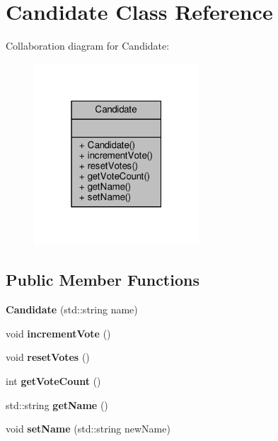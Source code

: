 \hypertarget{classCandidate}{}\section{Candidate Class Reference}
\label{classCandidate}


Collaboration diagram for Candidate\+:\nopagebreak
\begin{figure}[H]
\begin{center}
\leavevmode
\includegraphics[width=175pt]{classCandidate__coll__graph}
\end{center}
\end{figure}
\subsection*{Public Member Functions}
\begin{DoxyCompactItemize}
\item 
\mbox{\label{classCandidate_a99c1eda1eeecf4bbd054049449954c90}} 
{\bfseries Candidate} (std\+::string name)
\item 
\mbox{\label{classCandidate_aebdd30b267da46060d03374cc76c2603}} 
void {\bfseries increment\+Vote} ()
\item 
\mbox{\label{classCandidate_a2d4e7b4d2e0d32468688e5e4c2c9b098}} 
void {\bfseries reset\+Votes} ()
\item 
\mbox{\label{classCandidate_acce26ecaedcc448a3c90b9af5f45dea6}} 
int {\bfseries get\+Vote\+Count} ()
\item 
\mbox{\label{classCandidate_af862d92e21d66d74f1d5cae92937d3da}} 
std\+::string {\bfseries get\+Name} ()
\item 
\mbox{\label{classCandidate_afd7bc6e324ab669a9440778680a0a5d3}} 
void {\bfseries set\+Name} (std\+::string new\+Name)
\end{DoxyCompactItemize}
